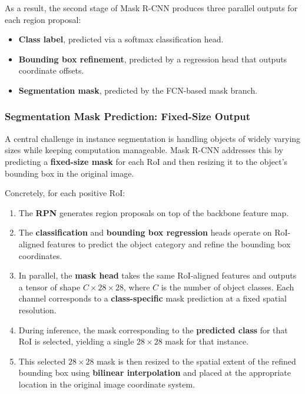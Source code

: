 \noindent As a result, the second stage of Mask R-CNN produces three parallel outputs for each region proposal:

\begin{itemize}
	\item \textbf{Class label}, predicted via a softmax classification head.
	\item \textbf{Bounding box refinement}, predicted by a regression head that outputs coordinate offsets.
	\item \textbf{Segmentation mask}, predicted by the FCN-based mask branch.
\end{itemize}

\subsubsection{Segmentation Mask Prediction: Fixed-Size Output}

\noindent A central challenge in instance segmentation is handling objects of widely varying sizes while keeping computation manageable. Mask R-CNN addresses this by predicting a \textbf{fixed-size mask} for each RoI and then resizing it to the object’s bounding box in the original image.

\noindent Concretely, for each positive RoI:

\begin{enumerate}
	\item The \textbf{RPN} generates region proposals on top of the backbone feature map.
	\item The \textbf{classification} and \textbf{bounding box regression} heads operate on RoI-aligned features to predict the object category and refine the bounding box coordinates.
	\item In parallel, the \textbf{mask head} takes the same RoI-aligned features and outputs a tensor of shape \(C \times 28 \times 28\), where \(C\) is the number of object classes. Each channel corresponds to a \textbf{class-specific} mask prediction at a fixed spatial resolution.
	\item During inference, the mask corresponding to the \textbf{predicted class} for that RoI is selected, yielding a single \(28 \times 28\) mask for that instance.
	\item This selected \(28 \times 28\) mask is then resized to the spatial extent of the refined bounding box using \textbf{bilinear interpolation} and placed at the appropriate location in the original image coordinate system.
\end{enumerate}

